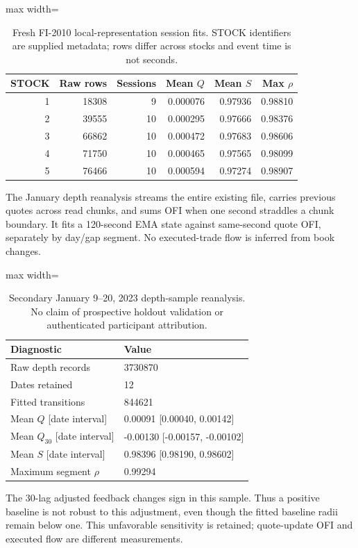 \documentclass[12pt]{article}
\theoremstyle{definition}
\theoremstyle{remark}
\begin{document}
\begin{table}[htbp]
\centering\small
\caption{Fresh FI-2010 local-representation session fits. STOCK identifiers are supplied metadata; rows differ across stocks and event time is not seconds.}
\label{tab:equity_revised}
\begin{adjustbox}{max width=\textwidth}
\begin{tabular}{rrrrrr}\toprule
STOCK & Raw rows & Sessions & Mean $Q$ & Mean $S$ & Max $\rho$ \\\midrule
1 & 18308 & 9 & 0.000076 & 0.97936 & 0.98810 \\
2 & 39555 & 10 & 0.000295 & 0.97666 & 0.98376 \\
3 & 66862 & 10 & 0.000472 & 0.97683 & 0.98606 \\
4 & 71750 & 10 & 0.000465 & 0.97565 & 0.98099 \\
5 & 76466 & 10 & 0.000594 & 0.97274 & 0.98907 \\
\bottomrule\end{tabular}
\end{adjustbox}
\end{table}

The January depth reanalysis streams the entire existing file, carries previous quotes across read chunks, and sums OFI when one second straddles a chunk boundary. It fits a 120-second EMA state against same-second quote OFI, separately by day/gap segment. No executed-trade flow is inferred from book changes.

\begin{table}[htbp]
\centering\small
\caption{Secondary January 9--20, 2023 depth-sample reanalysis. No claim of prospective holdout validation or authenticated participant attribution.}
\label{tab:depth_revised}
\begin{adjustbox}{max width=\textwidth}
\begin{tabular}{ll}\toprule
Diagnostic & Value \\\midrule
Raw depth records & 3730870 \\
Dates retained & 12 \\
Fitted transitions & 844621 \\
Mean $Q$ [date interval] & 0.00091 [0.00040, 0.00142] \\
Mean $Q_{30}$ [date interval] & -0.00130 [-0.00157, -0.00102] \\
Mean $S$ [date interval] & 0.98396 [0.98190, 0.98602] \\
Maximum segment $\rho$ & 0.99294 \\
\bottomrule\end{tabular}
\end{adjustbox}
\end{table}
The 30-lag adjusted feedback changes sign in this sample. Thus a positive baseline is not robust to this adjustment, even though the fitted baseline radii remain below one. This unfavorable sensitivity is retained; quote-update OFI and executed flow are different measurements.
\end{document}
